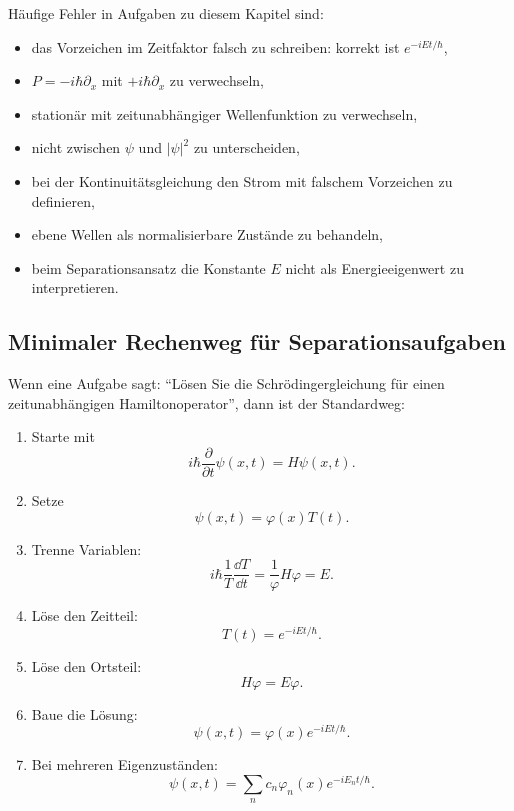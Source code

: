 \begin{examtipbox}
Häufige Fehler in Aufgaben zu diesem Kapitel sind:
\begin{itemize}
    \item das Vorzeichen im Zeitfaktor falsch zu schreiben: korrekt ist $e^{-iEt/\hbar}$,
    \item $P=-i\hbar\partial_x$ mit $+i\hbar\partial_x$ zu verwechseln,
    \item stationär mit zeitunabhängiger Wellenfunktion zu verwechseln,
    \item nicht zwischen $\psi$ und $|\psi|^2$ zu unterscheiden,
    \item bei der Kontinuitätsgleichung den Strom mit falschem Vorzeichen zu definieren,
    \item ebene Wellen als normalisierbare Zustände zu behandeln,
    \item beim Separationsansatz die Konstante $E$ nicht als Energieeigenwert zu interpretieren.
\end{itemize}
\end{examtipbox}

\subsection{Minimaler Rechenweg für Separationsaufgaben}

Wenn eine Aufgabe sagt: 
\enquote{Lösen Sie die Schrödingergleichung für einen zeitunabhängigen Hamiltonoperator}, dann ist der Standardweg:

\begin{calculationbox}
\begin{enumerate}
    \item Starte mit
    \[
        i\hbar\frac{\partial}{\partial t}\psi(x,t)=H\psi(x,t).
    \]
    \item Setze
    \[
        \psi(x,t)=\varphi(x)T(t).
    \]
    \item Trenne Variablen:
    \[
        i\hbar\frac{1}{T}\frac{\dd T}{\dd t}
        =\frac{1}{\varphi}H\varphi=E.
    \]
    \item Löse den Zeitteil:
    \[
        T(t)=e^{-iEt/\hbar}.
    \]
    \item Löse den Ortsteil:
    \[
        H\varphi=E\varphi.
    \]
    \item Baue die Lösung:
    \[
        \psi(x,t)=\varphi(x)e^{-iEt/\hbar}.
    \]
    \item Bei mehreren Eigenzuständen:
    \[
        \psi(x,t)=\sum_n c_n\varphi_n(x)e^{-iE_nt/\hbar}.
    \]
\end{enumerate}
\end{calculationbox}

